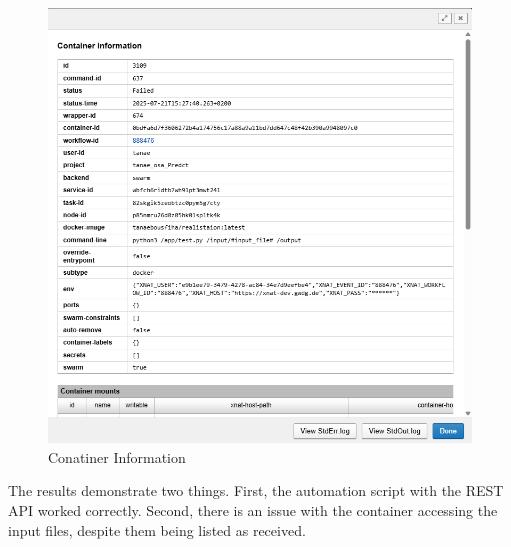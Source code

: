 \begin{figure}
    \centering
    \includegraphics[width=0.8\linewidth]{en/content/Container information 2.png}
    \caption{Conatiner Information }
    \label{fig:enter-label}
\end{figure}


The results demonstrate two things.  First, the automation script with the REST API worked correctly. Second, there is an issue with the container accessing the input files, despite them being listed as received.
